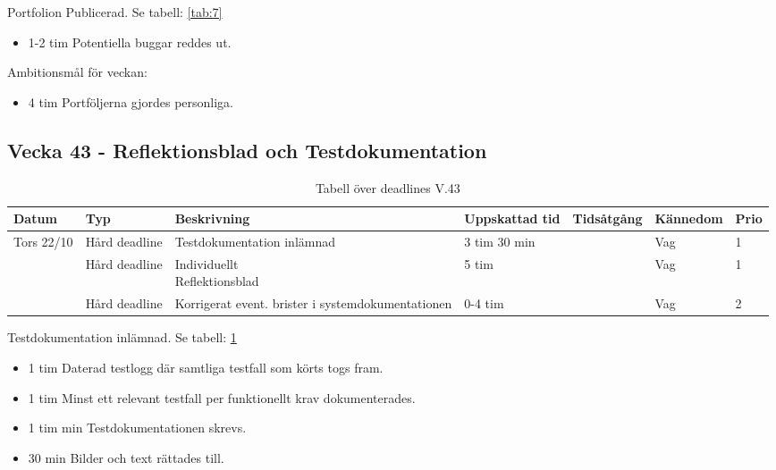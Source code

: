 \documentclass{TDP003mall}
\begin{document}
Portfolion Publicerad. Se tabell: \ref{tab:7}
\begin{itemize}
\item 1-2 tim Potentiella buggar reddes ut.
  \end{itemize}

Ambitionsmål för veckan:
\begin{itemize}
\item 4 tim Portföljerna gjordes personliga.
\end{itemize}

\newpage

\subsection*{Vecka 43 - Reflektionsblad och Testdokumentation}
\begin{table}[h!]
\caption{Tabell över deadlines V.43\label{tab:8}}  
\begin{tabularx}{\linewidth}{|l|l|X|l|l|l|l|}
  \hline
  Datum      & Typ           & Beskrivning                                       & Uppskattad tid & Tidsåtgång & Kännedom & Prio \\ [0.5ex]
  \hline                                                                             
  Tors 22/10 & Hård deadline & Testdokumentation inlämnad                        & 3 tim 30 min   &            & Vag      & 1\\
  \hline                                                                             
             & Hård deadline & \makecell[tl]{Individuellt \\ Reflektionsblad}    & 5 tim          &            & Vag      & 1\\
  \hline                                                                             
             & Hård deadline & Korrigerat event. brister i systemdokumentationen & 0-4 tim        &            & Vag      & 2\\
  \hline
\end{tabularx}      
      \end{table}

Testdokumentation inlämnad. Se tabell: \ref{tab:8}
\begin{itemize}
  \item 1 tim Daterad testlogg där samtliga testfall som körts togs fram.
  \item 1 tim Minst ett relevant testfall per funktionellt krav dokumenterades.
  \item 1 tim min Testdokumentationen skrevs.
  \item 30 min Bilder och text rättades till.
\end{itemize}
\end{document}
